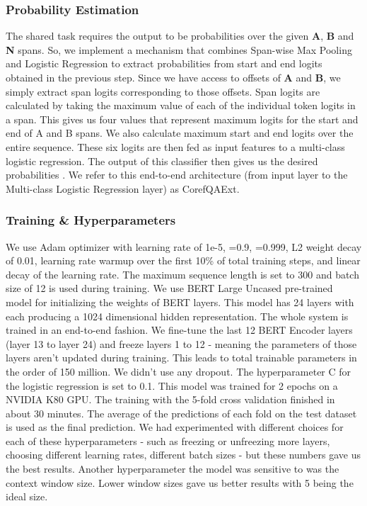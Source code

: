 \documentclass[11pt,a4paper]{article}
\begin{document}
\subsubsection{Probability Estimation}

The shared task requires the output to be probabilities over the given \textbf{A}, \textbf{B} and \textbf{N} spans. So, we implement a mechanism that combines Span-wise Max Pooling and Logistic Regression to extract probabilities from start and end logits obtained in the previous step. Since we have access to offsets of \textbf{A} and \textbf{B}, we simply extract span logits corresponding to those offsets. Span logits are calculated by taking the maximum value of each of the individual token logits in a span. This gives us four values that represent maximum logits for the start and end of A and B spans. We also calculate maximum start and end logits over the entire sequence. These six logits are then fed as input features to a multi-class logistic regression. The output of this classifier then gives us the desired probabilities . We refer to this end-to-end architecture (from input layer to the Multi-class Logistic Regression layer) as CorefQAExt.

\subsubsection{Training \& Hyperparameters}

We use Adam optimizer with learning rate of 1e-5, =0.9, =0.999, L2 weight decay of 0.01, learning rate warmup over the first 10\% of total training steps, and linear decay of the learning rate. The maximum sequence length is set to 300 and batch size of 12 is used during training. We use BERT Large Uncased pre-trained model for initializing the weights of BERT layers. This model has 24 layers with each producing a 1024 dimensional hidden representation. The whole system is trained in an end-to-end fashion. We fine-tune the last 12 BERT Encoder layers (layer 13 to layer 24) and freeze layers 1 to 12 - meaning the parameters of those layers aren't updated during training. This leads to total trainable parameters in the order of 150 million. We didn't use any dropout. The hyperparameter C for the logistic regression is set to 0.1. This model was trained for 2 epochs on a NVIDIA K80 GPU. The training with the 5-fold cross validation finished in about 30 minutes. The average of the predictions of each fold on the test dataset is used as the final prediction. We had experimented with different choices for each of these hyperparameters - such as freezing or unfreezing more layers, choosing different learning rates, different batch sizes - but these numbers gave us the best results. Another hyperparameter the model was sensitive to was the context window size. Lower window sizes gave us better results with 5 being the ideal size.
\end{document}
